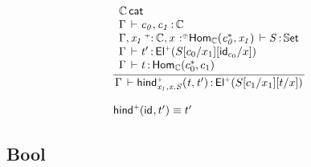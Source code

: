 \documentclass[11pt]{article}
\theoremstyle{plain}
\begin{document}
\[
\begin{array}{l}
\infer{\oftp{\Gamma}{\morindco{x_1,x.S}{t}{t'}}{\Elp{\subst{\subst{S}{c_1}{x_1}}{t}{x}}}}
      { \begin{array}{l}
          \wfdtp{\C} \\
          \oftp{\Gamma}{c_0,c_1}{\C} \\
          \ofdtp{\Gamma,\vtptm{x_1}{\co}{\C},\tptmv{x}{\coc}{\Hom{\C}{c_0^*}{x_1}}}{S}{\types} \\
          \oftp{\Gamma}{t'}{\Elp{\subst{\subst{S}{c_0}{x_1}}{\idm{c_0}}{x}}} \\
          \oftp{\Gamma}{t}{\Hom{\C}{c_0^*}{c_1}} \\
        \end{array}
      }
\\ \\
\morindco{}{\idm{}}{t'} \deq t'
\end{array}
\]



\subsection{Bool}
\end{document}
